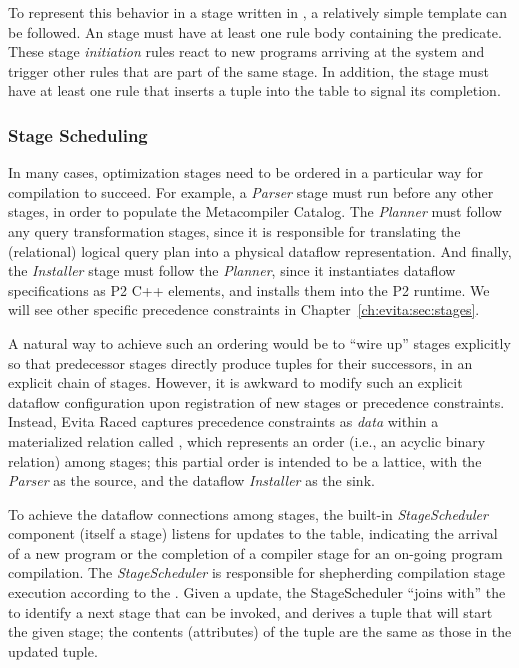 To represent this behavior in a stage written in \OVERLOG, a relatively simple
template can be followed.  An \OVERLOG stage must have at least one rule body
containing the  predicate.  These stage {\em
initiation} rules react to new programs arriving at the system and trigger
other rules that are part of the same stage.  In addition, the stage must have
at least one rule that inserts a  tuple into the  table
to signal its completion. 

\subsubsection{Stage Scheduling}
\label{ch:evita:sec:stageschedule}

In many cases, optimization stages need to be ordered in a particular way for
compilation to succeed.  For example, a {\em Parser} stage must run before any
other stages, in order to populate the Metacompiler Catalog.  The {\em Planner}
must follow any query transformation stages, since it is responsible for
translating the (relational) logical query plan into a physical dataflow
representation.  And finally, the {\em Installer} stage must follow the {\em
Planner}, since it instantiates dataflow specifications as P2 C++ elements, and
installs them into the P2 runtime.  We will see other specific precedence
constraints in Chapter~\ref{ch:evita:sec:stages}.

A natural way to achieve such an ordering would be to ``wire up'' stages
explicitly so that predecessor stages directly produce
 tuples for their successors, in an explicit chain of
stages.  However, it is awkward to modify such an explicit dataflow
configuration upon registration of new stages or precedence constraints.
Instead, Evita Raced captures precedence constraints as {\em data} within a
materialized relation called , which represents an
order (i.e., an acyclic binary relation) among stages; this partial
order is intended to be a lattice, with the {\em Parser} as the source, and the
dataflow {\em Installer} as the sink.  
 
To achieve the dataflow connections among stages, the built-in {\em
StageScheduler} component (itself a stage) listens for updates to the
 table, indicating the arrival of a new \OVERLOG program or the
completion of a compiler stage for an on-going program compilation.  The {\em
StageScheduler} is responsible for shepherding compilation stage execution
according to the .  Given a  update, the
StageScheduler ``joins with'' the  to identify a next stage
that can be invoked, and derives a  tuple that will
start the given stage; the contents (attributes) of the
 tuple are the same as those in the updated
 tuple.

